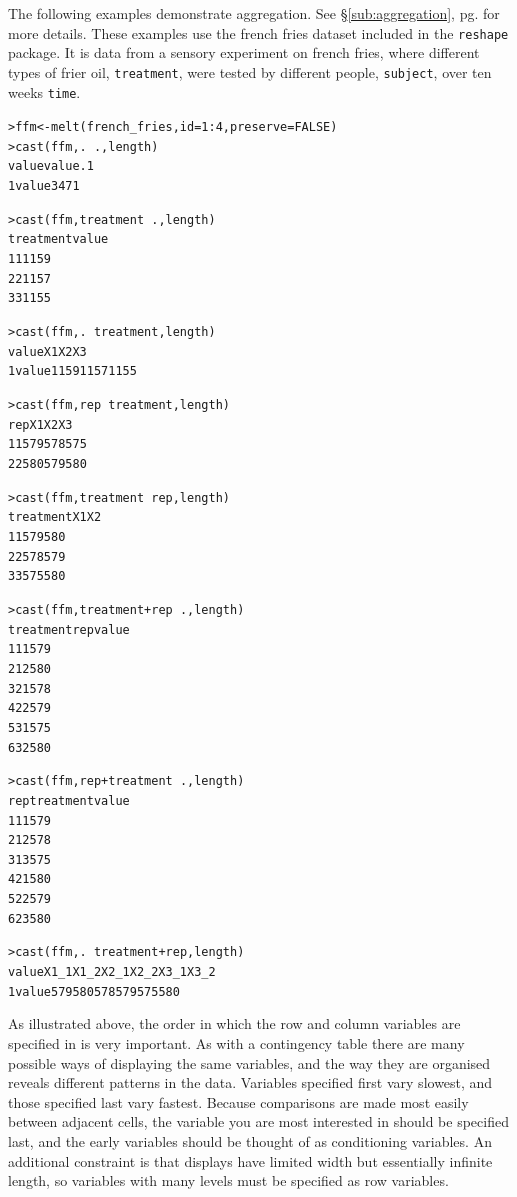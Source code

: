 \documentclass[oneside,letterpaper]{scrartcl}
\newcommand{\secref}[1]{\S \ref{#1}, pg. \pageref{#1}}
\begin{document}
The following examples demonstrate aggregation.  See \secref{sub:aggregation} for more details.  These examples use the french fries dataset included in the {\tt reshape} package.  It is data from a sensory experiment on french fries, where different types of frier oil, {\tt treatment}, were tested by different people, {\tt subject}, over ten weeks {\tt time}.

\begin{alltt}
> ffm <- melt(french_fries, id = 1:4, preserve = FALSE)
> cast(ffm, . ~ ., length)
  value value.1
1 value    3471

> cast(ffm, treatment ~ ., length)
  treatment value
1         1  1159
2         2  1157
3         3  1155

> cast(ffm, . ~ treatment, length)
  value   X1   X2   X3
1 value 1159 1157 1155

> cast(ffm, rep ~ treatment, length)
  rep  X1  X2  X3
1   1 579 578 575
2   2 580 579 580

> cast(ffm, treatment ~ rep, length)
  treatment  X1  X2
1         1 579 580
2         2 578 579
3         3 575 580

> cast(ffm, treatment + rep ~ ., length)
  treatment rep value
1         1   1   579
2         1   2   580
3         2   1   578
4         2   2   579
5         3   1   575
6         3   2   580

> cast(ffm, rep + treatment ~ ., length)
  rep treatment value
1   1         1   579
2   1         2   578
3   1         3   575
4   2         1   580
5   2         2   579
6   2         3   580

> cast(ffm, . ~ treatment + rep, length)
  value X1_1 X1_2 X2_1 X2_2 X3_1 X3_2
1 value  579  580  578  579  575  580

\end{alltt}

As illustrated above, the order in which the row and column variables are specified in is very important.  As with a contingency table there are many possible ways of displaying the same variables, and the way they are organised reveals different patterns in the data.  Variables specified first vary slowest, and those specified last vary fastest.  Because comparisons are made most easily between adjacent cells, the variable you are most interested in should be specified last, and the early variables should be thought of as conditioning variables.  An additional constraint is that displays have limited width but essentially infinite length, so variables with many levels must be specified as row variables.  
\end{document}
